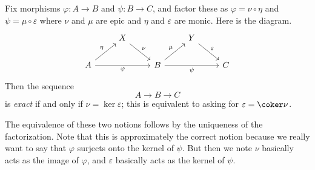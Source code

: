 \documentclass[../notes.tex]{subfiles}
\begin{document}
\begin{definition}[exact]
	Fix morphisms $\varphi\colon A\to B$ and $\psi\colon B\to C$, and factor these as $\varphi=\nu\circ\eta$ and $\psi=\mu\circ\varepsilon$ where $\nu$ and $\mu$ are epic and $\eta$ and $\varepsilon$ are monic. Here is the diagram.
	\[\begin{tikzcd}
		& X && Y \\
		A && B && C
		\arrow["\eta", from=2-1, to=1-2]
		\arrow["\nu", from=1-2, to=2-3]
		\arrow["\varphi"', from=2-1, to=2-3]
		\arrow["\psi"', from=2-3, to=2-5]
		\arrow["\mu", from=2-3, to=1-4]
		\arrow["\varepsilon", from=1-4, to=2-5]
	\end{tikzcd}\]
	Then the sequence
	\[A\to B\to C\]
	is \textit{exact} if and only if $\nu=\ker\varepsilon$; this is equivalent to asking for $\varepsilon=\coker\nu$.
\end{definition}
The equivalence of these two notions follows by the uniqueness of the factorization. Note that this is approximately the correct notion because we really want to say that $\varphi$ surjects onto the kernel of $\psi$. But then we note $\nu$ basically acts as the image of $\varphi$, and $\varepsilon$ basically acts as the kernel of $\psi$.
\end{document}
